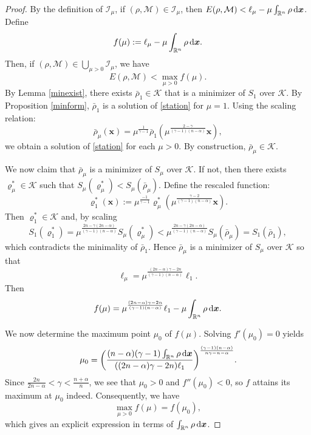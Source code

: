 \documentclass[reqno,11pt]{amsart}
\numberwithin{equation}{section}
\theoremstyle{definition}
\def\dd{{\, \rm d}}
\begin{document}
\begin{proof}
    By the definition of $\mathcal{I}_\mu$, 
    if $(\rho,\mathcal{M}) \in \mathcal{I}_\mu$, 
    then $E(\rho,\mathcal{M}) < \ell_\mu - \mu \int_{\mathbb{R}^n} \rho \dd \boldsymbol{x}$. 
    Define
    $$
    f(\mu) := \ell_\mu - \mu \int_{\mathbb{R}^n} \rho \dd \boldsymbol{x}.
    $$
Then, if $(\rho,\mathcal{M}) \in \bigcup_{\mu > 0} \mathcal{I}_\mu$, we have
    \begin{equation}\label{muset}
        E(\rho,\mathcal{M}) < \max_{\mu > 0} f(\mu).
    \end{equation}
    By Lemma \ref{minexist}, there exists $\bar{\rho}_1 \in \mathcal{K}$ that is a minimizer 
    of $S_1$ over $\mathcal{K}$.
    By Proposition \ref{minform}, $\bar{\rho}_1$ is a solution of \eqref{station} for $\mu = 1$. 
    Using the scaling relation:
    $$
    \bar{\rho}_\mu(\boldsymbol{x}) 
    = \mu^\frac{1}{\gamma - 1}\bar{\rho}_1(\mu^\frac{2-\gamma}{(\gamma - 1)(n-\alpha)} \boldsymbol{x}),
    $$ 
    we obtain a solution of \eqref{station} for each $\mu > 0$.
    By construction, $\bar{\rho}_\mu \in \mathcal{K}$. 
    
    We now claim that $\bar{\rho}_\mu$ is a minimizer of $S_\mu$ over $\mathcal{K}$. 
    If not, then there exists $\varrho^*_\mu \in \mathcal{K}$ such that 
    $S_\mu(\varrho^*_\mu) < S_\mu(\bar{\rho}_\mu)$. 
    Define the rescaled function:
    $$
    \varrho^*_1(\boldsymbol{x}) 
    := \mu^\frac{-1}{\gamma - 1}\varrho^*_\mu 
    (\mu^\frac{\gamma - 2}{(\gamma - 1)(n-\alpha)} \boldsymbol{x}).
    $$ 
    Then $\varrho^*_1 \in \mathcal{K}$ and, by scaling
    $$
    S_1(\varrho^*_1) = \mu^\frac{2n - \gamma(2n - \alpha)}{(\gamma - 1)(n - \alpha)} S_\mu(\varrho^*_\mu) < \mu^\frac{2n - \gamma(2n - \alpha)}{(\gamma - 1)(n - \alpha)} S_\mu(\bar{\rho}_\mu) = S_1(\bar{\rho}_1),
    $$
which contradicts the minimality of $\bar{\rho}_1$. 
Hence $\bar{\rho}_\mu$ is a minimizer of $S_\mu$ over $\mathcal{K}$ so that
    \[
\ell_\mu = \mu^\frac{(2n - \alpha)\gamma - 2n}{(\gamma - 1)(n - \alpha)} \ell_1.
    \]
Then
    \[
 f(\mu) = \mu^\frac{(2n - \alpha)\gamma - 2n}{(\gamma - 1)(n - \alpha)} \ell_1 - \mu \int_{\mathbb{R}^n} \rho \dd \boldsymbol{x}.
    \]

We now determine the maximum point $\mu_0$ of $f(\mu)$. 
Solving $f'(\mu_0)=0$ yields 
    \begin{equation}\label{mu0}
 \mu_0 = \bigg ( \frac{(n-\alpha)(\gamma - 1)\int_{\mathbb{R}^n} \rho \dd \boldsymbol{x}}{((2n - \alpha)\gamma - 2n) \ell_1} \bigg )^\frac{(\gamma - 1)(n - \alpha)}{n\gamma - n - \alpha}.
    \end{equation}
Since $\frac{2n}{2n - \alpha} < \gamma < \frac{n + \alpha}{n}$, we see that $\mu_0 > 0$ and 
    $f''(\mu_0) < 0$, so $f$ attains its maximum at $\mu_0$ indeed.
Consequently, we have
\[
  \max_{\mu > 0} f(\mu) = f(\mu_0),
\]        
which gives an explicit expression in terms of $\int_{\mathbb{R}^n} \rho \dd \boldsymbol{x}$.


\end{proof}
\end{document}
